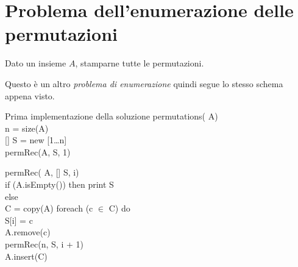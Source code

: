 \section{Problema dell'enumerazione delle permutazioni}
\begin{problem}
    Dato un insieme $A$, stamparne tutte le permutazioni.
\end{problem}

\noindent
Questo è un altro \emph{problema di enumerazione} quindi segue lo stesso schema
appena visto.

\begin{minicode}{Prima implementazione della soluzione}
\ind permutations( A)\\
     n = size(A)\\
    [] S = new [1\dots n]\\
    permRec(A, S, 1)
\end{minicode}
\newpage
\begin{codecont}
permRec( A, [] S,  i)\\
    \ind if (A.isEmpty()) then\hfill{}
        \indf print S\\
    \ind else\\
        \indf{} C = copy(A)\hfill{}
        \indf foreach (c $\in$ C) do\\
            \indff S[i] = c\\
            \indff A.remove(c)\\
            \indff permRec(n, S, i + 1)\\
            \indff A.insert(C)
\end{codecont}

